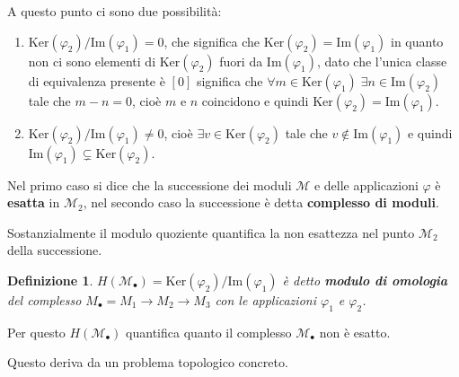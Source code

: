 \documentclass[10pt, twoside=false, x11names]{scrbook}
\newtheorem{definition}[theorem]{Definizione}
\newcommand{\M}{\mathcal{M}}
\newcommand{\im}[1]{\mathrm{Im}( #1 )}
\renewcommand{\ker}[1]{\mathrm{Ker}( #1)}
\renewcommand{\phi}{\varphi}
\begin{document}
A questo punto ci sono due possibilità:
\begin{enumerate}
\item $ {\ker {\phi_2}} \slash {\im{\phi_1}} = 0 $, che significa che $ \ker {\phi_2} = \im{\phi_1} $
  in quanto non ci sono elementi di $ \ker {\phi_2} $ fuori da $ \im{\phi_1} $, dato che l'unica
  classe di equivalenza presente è $ [0] $ significa che $ \forall m \in \ker{\phi_1} \; \exists n \in \im{\phi_2} $
  tale che $ m - n = 0 $, cioè $ m $ e $ n $ coincidono e quindi $ \ker {\phi_2} = \im{\phi_1} $.
\item $ {\ker {\phi_2}} \slash {\im{\phi_1}} \not= 0 $, cioè $ \exists v \in \ker {\phi_2} $
  tale che $ v \not \in \im {\phi_1} $ e quindi $ \im {\phi_1} \subsetneq \ker {\phi_2}$.
\end{enumerate}
Nel primo caso si dice che la successione dei moduli $ \M $ e delle
applicazioni $ \phi $ è \textbf{esatta} in $ \M_2$, nel secondo caso la
successione è detta \textbf{complesso di moduli}.

Sostanzialmente il modulo quoziente quantifica la non esattezza nel punto $ \M_2 $
della successione.

\begin{definition}
  $ H(\M_\bullet) = {\ker {\phi_2}} \slash {\im {\phi_1}} $ è detto \textbf{modulo di omologia} 
  del complesso $ M_\bullet = M_1 \longrightarrow M_2 \longrightarrow M_3 $ con le applicazioni $ \phi_1 $ e $ \phi_2 $.
\end{definition}
Per questo  $ H(\M_\bullet) $ quantifica quanto il complesso $ \M_\bullet $ non è esatto.

Questo deriva da un problema topologico concreto.
\end{document}
